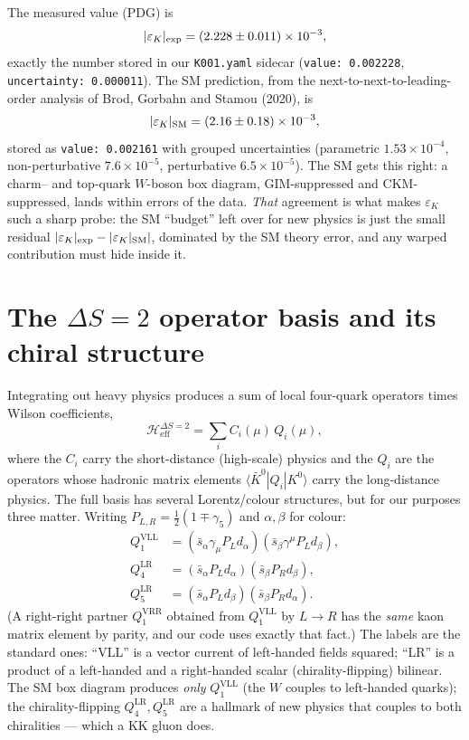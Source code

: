 \documentclass[11pt]{article}
\newcommand{\epsK}{\varepsilon_K}
\newcommand{\half}{\tfrac{1}{2}}
\newcommand{\QVLL}{Q_1^{\mathrm{VLL}}}
\newcommand{\QLRfour}{Q_4^{\mathrm{LR}}}
\newcommand{\QLRfive}{Q_5^{\mathrm{LR}}}
\newcommand{\code}[1]{\texttt{#1}}
\theoremstyle{definition}
\begin{document}
The measured value (PDG) is
\begin{equation}
|\epsK|_{\rm exp} = (2.228 \pm 0.011)\times10^{-3},
\label{eq:epskexp}
\end{equation}
exactly the number stored in our \code{K001.yaml} sidecar
(\code{value: 0.002228}, \code{uncertainty: 0.000011}). The SM prediction, from
the next-to-next-to-leading-order analysis of Brod, Gorbahn and Stamou (2020),
is
\begin{equation}
|\epsK|_{\rm SM} = (2.16 \pm 0.18)\times10^{-3},
\label{eq:epsksm}
\end{equation}
stored as \code{value: 0.002161} with grouped uncertainties (parametric
$1.53\times10^{-4}$, non-perturbative $7.6\times10^{-5}$, perturbative
$6.5\times10^{-5}$). The SM gets this right: a charm-- and top-quark $W$-boson box
diagram, GIM-suppressed and CKM-suppressed, lands within errors of the data.
\emph{That} agreement is what makes $\epsK$ such a sharp probe: the SM ``budget''
left over for new physics is just the small residual
$|\epsK|_{\rm exp} - |\epsK|_{\rm SM}|$, dominated by the SM theory error, and
any warped contribution must hide inside it.

\section{The $\Delta S=2$ operator basis and its chiral structure}
\label{sec:basis}

Integrating out heavy physics produces a sum of local four-quark operators times
Wilson coefficients,
\begin{equation}
\mathcal{H}_{\mathrm{eff}}^{\Delta S=2} = \sum_i C_i(\mu)\,Q_i(\mu) ,
\end{equation}
where the $C_i$ carry the short-distance (high-scale) physics and the $Q_i$ are
the operators whose hadronic matrix elements $\langle\bar K^0|Q_i|K^0\rangle$
carry the long-distance physics. The full basis has several Lorentz/colour
structures, but for our purposes three matter. Writing $P_{L,R}=\half(1\mp\gamma_5)$
and $\alpha,\beta$ for colour:
\begin{align}
\QVLL  &= (\bar s_\alpha \gamma_\mu P_L d_\alpha)(\bar s_\beta \gamma^\mu P_L d_\beta),
\label{eq:QVLL}\\
\QLRfour &= (\bar s_\alpha P_L d_\alpha)(\bar s_\beta P_R d_\beta),
\label{eq:QLR4}\\
\QLRfive &= (\bar s_\alpha P_L d_\beta)(\bar s_\beta P_R d_\alpha).
\label{eq:QLR5}
\end{align}
(A right-right partner $Q_1^{\mathrm{VRR}}$ obtained from $\QVLL$ by $L\to R$ has
the \emph{same} kaon matrix element by parity, and our code uses exactly that
fact.) The labels are the standard ones: ``VLL'' is a vector current of
left-handed fields squared; ``LR'' is a product of a left-handed and a
right-handed scalar (chirality-flipping) bilinear. The SM box diagram produces
\emph{only} $\QVLL$ (the $W$ couples to left-handed quarks); the chirality-flipping
$\QLRfour,\QLRfive$ are a hallmark of new physics that couples to both
chiralities --- which a KK gluon does.
\end{document}
